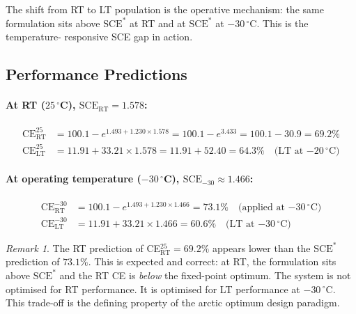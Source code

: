 \documentclass[11pt]{article}
\theoremstyle{plain}
\theoremstyle{definition}
\theoremstyle{remark}
\newtheorem{remark}{Remark}[section]
\begin{document}
The shift from RT to LT population is the operative mechanism: the
same formulation sits above $\mathrm{SCE}^{*}$ at RT and at
$\mathrm{SCE}^{*}$ at $-30\,^\circ$C.  This is the temperature-
responsive SCE gap in action.

\subsection{Performance Predictions}

\paragraph{At RT ($25\,^\circ$C), $\mathrm{SCE}_\mathrm{RT} = 1.578$:}

\begin{align}
  \mathrm{CE}_{\mathrm{RT}}^{25} &=
  100.1 - e^{1.493 + 1.230 \times 1.578}
  = 100.1 - e^{3.433} = 100.1 - 30.9 = 69.2\%
  \label{eq:CE_RT_25}\\[4pt]
  \mathrm{CE}_{\mathrm{LT}}^{25} &=
  11.91 + 33.21 \times 1.578 = 11.91 + 52.40 = 64.3\%
  \quad\text{(LT at $-20\,^\circ$C)}
  \label{eq:CE_LT_20}
\end{align}

\paragraph{At operating temperature ($-30\,^\circ$C),
$\mathrm{SCE}_{-30} \approx 1.466$:}

\begin{align}
  \mathrm{CE}_{\mathrm{RT}}^{-30} &=
  100.1 - e^{1.493 + 1.230 \times 1.466}
  = 73.1\%
  \quad\text{(applied at $-30\,^\circ$C)}
  \label{eq:CE_RT_30}\\[4pt]
  \mathrm{CE}_{\mathrm{LT}}^{-30} &=
  11.91 + 33.21 \times 1.466 = 60.6\%
  \quad\text{(LT at $-30\,^\circ$C)}
  \label{eq:CE_LT_30}
\end{align}

\begin{remark}
The RT prediction of CE$_\mathrm{RT}^{25} = 69.2\%$ appears lower
than the $\mathrm{SCE}^{*}$ prediction of $73.1\%$.  This is
expected and correct: at RT, the formulation sits above
$\mathrm{SCE}^{*}$ and the RT CE is \emph{below} the fixed-point
optimum.  The system is not optimised for RT performance.  It is
optimised for LT performance at $-30\,^\circ$C.  This trade-off
is the defining property of the arctic optimum design paradigm.
\end{remark}
\end{document}
